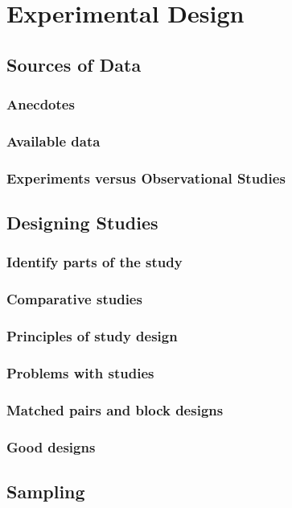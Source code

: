 \chapter{Experimental Design}  %

\section{Sources of Data}  %
\subsection{Anecdotes}  %
\subsection{Available data}  %
\subsection{Experiments versus Observational Studies}  %

\section{Designing Studies}  %
\subsection{Identify parts of the study}  %
\subsection{Comparative studies}  %
\subsection{Principles of study design}  %
\subsection{Problems with studies}  %
\subsection{Matched pairs and block designs}  %
\subsection{Good designs}  %

\section{Sampling}  %
